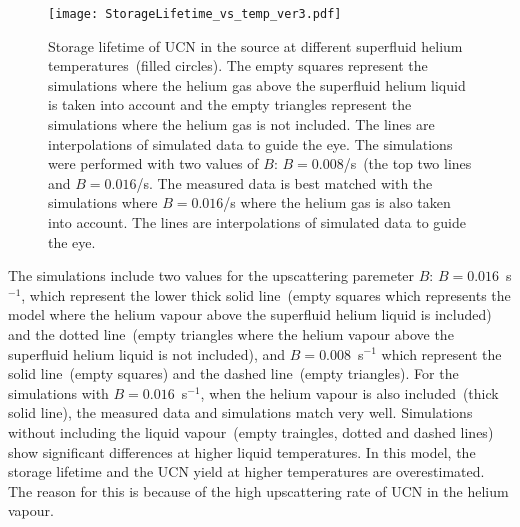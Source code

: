 \begin{figure}[h!]
  \centering
  \texttt{[image: StorageLifetime\_vs\_temp\_ver3.pdf]}
  \caption[UCN storage lifetime versus superfluid helium temperature
  data and simulations]{Storage lifetime of UCN in the source at
    different superfluid helium temperatures~(filled circles).  The
    empty squares represent the simulations where the helium gas above
    the superfluid helium liquid is taken into account and the empty
    triangles represent the simulations where the helium gas is not
    included. The lines are interpolations of simulated data to guide
    the eye. The simulations were performed with two values of $B$:
    $B = 0.008$/s~(the top two lines and $B = 0.016$/s. The measured
    data is best matched with the simulations where $B = 0.016$/s
    where the helium gas is also taken into account.  The lines are
    interpolations of simulated data to guide the eye.}
  \label{fig:storage_vs_temp_sim}
\end{figure}

The simulations include two values for the upscattering paremeter $B$:
$B= 0.016$~s$^{-1}$, which represent the lower thick solid line~(empty
squares which represents the model where the helium vapour above the
superfluid helium liquid is included) and the dotted line~(empty
triangles where the helium vapour above the superfluid helium liquid
is not included), and $B= 0.008$~s$^{-1}$ which represent the solid
line~(empty squares) and the dashed line~(empty triangles). For the
simulations with $B= 0.016$~s$^{-1}$, when the helium vapour is also
included~(thick solid line), the measured data and simulations match
very well. Simulations without including the liquid vapour~(empty
traingles, dotted and dashed lines) show significant differences at higher liquid
temperatures. In this model, the storage lifetime and the UCN yield at
higher temperatures are overestimated. The reason for this is because
of the high upscattering rate of UCN in the helium vapour.



